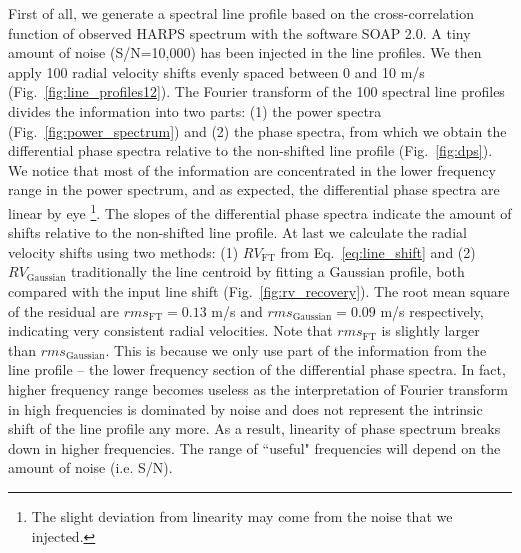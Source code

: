 First of all, we generate a spectral line profile based on the cross-correlation function of observed HARPS spectrum
with the software SOAP 2.0. A tiny amount of noise (S/N=10,000) has been injected in the line profiles. 
We then apply 100 radial velocity shifts evenly spaced between 0 and 10 m/s (Fig.~\ref{fig:line_profiles12}). 
The Fourier transform of the 100 spectral line profiles divides the information into two parts: 
(1) the power spectra (Fig.~\ref{fig:power_spectrum}) and (2) the phase spectra, from which we obtain the 
differential phase spectra relative to the non-shifted line profile (Fig.~\ref{fig:dps}). 
We notice that most of the information are concentrated in the lower frequency range in the power spectrum, and 
as expected, the differential phase spectra are linear by eye \footnote{The slight deviation from linearity may come from
the noise that we injected.}. The slopes of the differential phase spectra indicate the amount of shifts relative to 
the non-shifted line profile. At last we calculate the radial velocity shifts using two methods: 
(1) $RV_\text{FT}$ from Eq.~\ref{eq:line_shift} and 
(2) $RV_\text{Gaussian}$ traditionally the line centroid by fitting a Gaussian profile, both compared with 
the input line shift (Fig.~\ref{fig:rv_recovery}). The root mean square of the residual
are $rms_\text{FT} = 0.13$ m/s and $rms_\text{Gaussian} = 0.09$ m/s respectively, indicating 
very consistent radial velocities. Note that $rms_\text{FT}$ is slightly larger than $rms_\text{Gaussian}$.
This is because we only use part of the information from the line profile -- the lower frequency section of the 
differential phase spectra. In fact, higher frequency range becomes useless 
as the interpretation of Fourier transform in high frequencies is dominated by noise and does not represent the 
intrinsic shift of the line profile any more. As a result, linearity of phase spectrum breaks down in higher frequencies. 
The range of ``useful" frequencies will depend on the amount of noise (i.e. S/N). 

